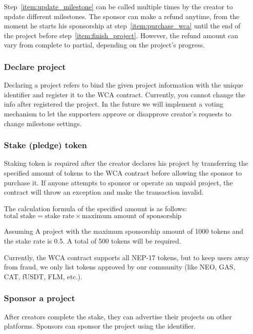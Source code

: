 Step~\ref{item:update_milestone} can be called multiple times by the creator
to update different milestones.
The sponsor can make a refund anytime, from the moment he starts his sponsorship
at step~\ref{item:purchase_wca} until the end of the project before
step~\ref{item:finish_project}.
However, the refund amount can vary from complete to partial, depending on
the project's progress.

\subsubsection{Declare project}

Declaring a project refers to bind the given project information with the
unique identifier and register it to the WCA contract.
Currently, you cannot change the info after registered the project.
In the future we will implement a voting mechanism to let the supporters approve
or disapprove creator's requests to change milestone settings.

\subsubsection{Stake (pledge) token}

Staking token is required after the creator declares his project by transferring
the specified amount of tokens to the WCA contract before allowing the sponsor
to purchase it.
If anyone attempts to sponsor or operate an unpaid project, the contract will
throw an exception and make the transaction invalid.

The calculation formula of the specified amount is as follows:
$\text{total stake} = \text{stake rate} \times \text{maximum amount of sponsorship}$

Assuming A project with the maximum sponsorship amount of 1000 tokens and
the stake rate is 0.5. A total of 500 tokens will be required.

Currently, the WCA contract supports all NEP-17 tokens, but to keep users away
from fraud, we only list tokens approved by our community (like NEO, GAS, CAT,
fUSDT, FLM, etc.).

\subsubsection{Sponsor a project}

After creators complete the stake, they can advertise their projects on other
platforms.
Sponsors can sponsor the project using the identifier.

